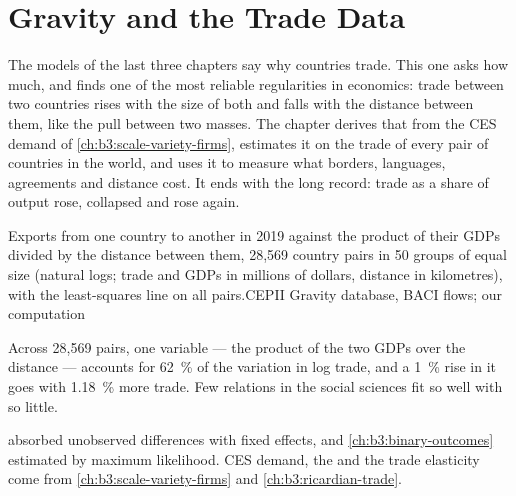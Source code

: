 \chapter{Gravity and the Trade Data}\label{ch:b3:gravity}

The models of the last three chapters say why countries trade. This one asks
how much, and finds one of the most reliable regularities in economics: trade
between two countries rises with the size of both and falls with the distance
between them, like the pull between two masses. The chapter derives that
\emph{} from the CES demand of \cref{ch:b3:scale-variety-firms},
estimates it on the trade of every pair of countries in the world, and uses it to
measure what borders, languages, agreements and distance cost. It ends with the
long record: trade as a share of output rose, collapsed and rose again.

\begin{openingchart}{Exports from one country to another in 2019 against the
product of their GDPs divided by the distance between them, 28{,}569 country
pairs in 50 groups of equal size (natural logs; trade and GDPs in millions of
dollars, distance in kilometres), with the least-squares line on all pairs.}{CEPII
Gravity database, BACI flows; our computation}
\end{openingchart}

Across 28{,}569 pairs, one variable --- the product of the two GDPs over the
distance --- accounts for 62~\% of the variation in log trade, and a 1~\% rise in it
goes with 1.18~\% more trade. Few relations in the social sciences fit so
well with so little.

\begin{recall}
 absorbed unobserved differences with fixed effects, and
\cref{ch:b3:binary-outcomes} estimated by maximum likelihood. CES demand, the
 and the trade elasticity come from
\cref{ch:b3:scale-variety-firms} and \cref{ch:b3:ricardian-trade}.
\end{recall}

